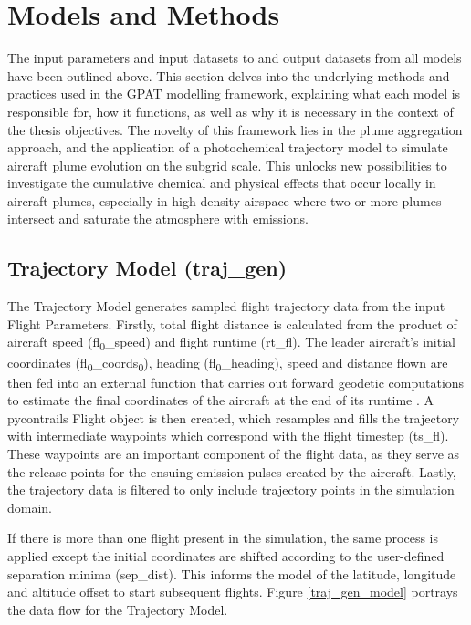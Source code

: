 \section{Models and Methods}
The input parameters and input datasets to and output datasets from all models have been outlined above. This section delves into the underlying methods and practices used in the GPAT modelling framework, explaining what each model is responsible for, how it functions, as well as why it is necessary in the context of the thesis objectives. The novelty of this framework lies in the plume aggregation approach, and the application of a photochemical trajectory model to simulate aircraft plume evolution on the subgrid scale. This unlocks new possibilities to investigate the cumulative chemical and physical effects that occur locally in aircraft plumes, especially in high-density airspace where two or more plumes intersect and saturate the atmosphere with emissions.

\subsection{Trajectory Model (traj\_gen)}
The Trajectory Model generates sampled flight trajectory data from the input Flight Parameters. Firstly, total flight distance is calculated from the product of aircraft speed (fl\textsubscript{0}\_speed) and flight runtime (rt\_fl). The leader aircraft's initial coordinates (fl\textsubscript{0}\_coords\textsubscript{0}), heading (fl\textsubscript{0}\_heading), speed and distance flown are then fed into an external function that carries out forward geodetic computations to estimate the final coordinates of the aircraft at the end of its runtime \cite{Pyproj2021}. A pycontrails Flight object is then created, which resamples and fills the trajectory with intermediate waypoints which correspond with the flight timestep (ts\_fl). These waypoints are an important component of the flight data, as they serve as the release points for the ensuing emission pulses created by the aircraft. Lastly, the trajectory data is filtered to only include trajectory points in the simulation domain.

If there is more than one flight present in the simulation, the same process is applied except the initial coordinates are shifted according to the user-defined separation minima (sep\_dist). This informs the model of the latitude, longitude and altitude offset to start subsequent flights. Figure \ref{traj_gen_model} portrays the data flow for the Trajectory Model.

